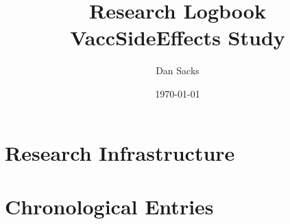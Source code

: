 \documentclass[11pt]{report}
\title{Research Logbook\\[0.5em]\large VaccSideEffects Study}
\author{Dan Sacks}
\date{\today}
\begin{document}
\maketitle
\tableofcontents
\newpage

\chapter{Research Infrastructure}

\localtableofcontents



\chapter{Chronological Entries}

\localtableofcontents






\end{document}
